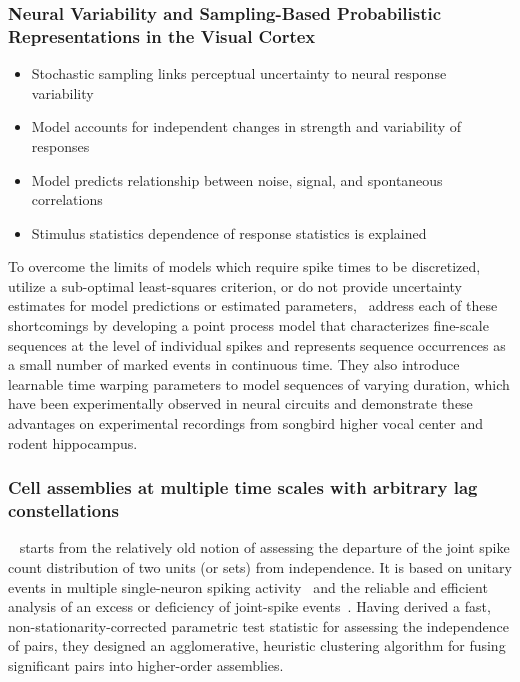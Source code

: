 \documentclass[brainsci, %
               review,submit,pdftex,moreauthors%
               ]{Definitions/mdpi}
\begin{document}
\subsubsection{Neural Variability and Sampling-Based Probabilistic Representations in the Visual Cortex~\citep{orban_neural_2016}}
\begin{itemize}
 \item
  Stochastic sampling links perceptual uncertainty to neural response variability
\item
  Model accounts for independent changes in strength and variability of responses
\item
  Model predicts relationship between noise, signal, and spontaneous correlations
\item
  Stimulus statistics dependence of response statistics is explained
\end{itemize}

To overcome the limits of models which require spike times to be discretized, utilize a sub-optimal least-squares criterion, or do not provide uncertainty estimates for model predictions or estimated parameters,~\citep{williams_point_2020} address each of these shortcomings by developing a point process model that characterizes fine-scale sequences at the level of individual spikes and represents sequence occurrences as a small number of marked events in continuous time. They also introduce learnable time warping parameters to model sequences of varying duration, which have been experimentally observed in neural circuits and demonstrate these advantages on experimental recordings from songbird higher vocal center and rodent hippocampus.


\subsubsection{Cell assemblies at multiple time scales with arbitrary lag constellations}\label{cell-assemblies-at-multiple-time-scales-with-arbitrary-lag-constellations}
~\citep{russo_cell_2017} starts from the relatively old notion of assessing the departure of the joint spike count distribution of two units (or sets) from independence. It is based on unitary events in multiple single-neuron spiking activity~\citep{grun_unitary_2002-1} and the reliable and efficient analysis of an excess or deficiency of joint-spike events~\citep{pipa_neuroxidence_2008}. Having derived a fast, non-stationarity-corrected parametric test statistic for assessing the independence of pairs, they designed an agglomerative, heuristic clustering algorithm for fusing significant pairs into higher-order assemblies.
\end{document}

